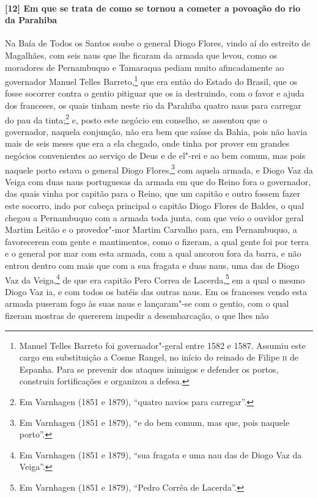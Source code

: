 \begin{linenumbers}
\paragraph{[12] Em que se trata de como se tornou a cometer a povoação do rio da Parahiba} \quad
Na Baía de Todos os Santos soube o general Diogo Flores, vindo aí do estreito de
Magalhães, com seis naus que lhe ficaram da armada que levou, como os moradores de
Pernambuquo e Tamaraqua pediam muito afincadamente ao governador Manuel Telles
Barreto,\footnote{ Manuel Telles Barreto foi governador"-geral entre 1582 e 1587. Assumiu
este cargo em substituição a Cosme Rangel, no início do reinado de Filipe \textsc{ii} de
Espanha. Para se prevenir dos ataques inimigos e defender os portos, construiu
fortificações e organizou a defesa.} que era então do Estado do Brasil, que os fosse
socorrer contra o gentio pitiguar que os ia destruindo, com o favor e ajuda dos franceses,
os quais tinham neste rio da Parahiba quatro naus para carregar do pau da tinta;\footnote{
Em Varnhagen (1851 e 1879), ``quatro navios para carregar''.} e, posto este negócio em
conselho, se assentou que o governador, naquela conjunção, não era bem que saísse da
Bahia, pois não havia mais de seis meses que era a ela chegado, onde tinha por prover em
grandes negócios convenientes ao serviço de Deus e de el"-rei e ao bem comum, mas pois
naquele porto estava o general Diogo Flores,\footnote{ Em Varnhagen (1851 e 1879), ``e do
bem comum, mas que, pois naquele porto''.} com aquela armada, e Diogo Vaz da Veiga com
duas naus portuguesas da armada em que do Reino fora o governador, das quais vinha por
capitão para o Reino, que um capitão e outro fossem fazer este socorro, indo por cabeça
principal o capitão Diogo Flores de Baldes, o qual chegou a Pernambuquo com a armada toda
junta, com que veio o ouvidor geral Martim Leitão e o provedor"-mor Martim Carvalho para,
em Pernambuquo, a favorecerem com gente e mantimentos, como o fizeram, a qual gente foi
por terra e o general por mar com esta armada, com a qual ancorou fora da barra, e não
entrou dentro com mais que com a sua fragata e duas naus, uma das de Diogo Vaz da
Veiga,\footnote{ Em Varnhagen (1851 e 1879), ``sua fragata e uma nau das de Diogo Vaz da
Veiga''.} de que era capitão Pero Correa de Lacerda,\footnote{ Em Varnhagen (1851 e 1879),
``Pedro Corrêa de Lacerda''.} em a qual o mesmo Diogo Vaz ia, e com todos os batéis das
outras naus. Em os franceses vendo esta armada puseram fogo às suas naus e lançaram"-se com
o gentio, com o qual fizeram mostras de quererem impedir a desembarcação, o que lhes não

\end{linenumbers}

